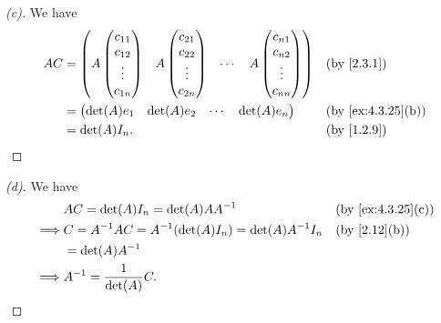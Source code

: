 \begin{proof}[(c)]
  We have
  \begin{align*}
    AC & = \begin{pmatrix}
             A \begin{pmatrix}
          c_{1 1} \\
          c_{1 2} \\
          \vdots  \\
          c_{1 n}
        \end{pmatrix} & A \begin{pmatrix}
                            c_{2 1} \\
                            c_{2 2} \\
                            \vdots  \\
                            c_{2 n}
                          \end{pmatrix} & \cdots & A \begin{pmatrix}
                                                       c_{n 1} \\
                                                       c_{n 2} \\
                                                       \vdots  \\
                                                       c_{n n}
                                                     \end{pmatrix}
           \end{pmatrix} &  & \by{2.3.1}                \\
       & = \begin{pmatrix}
             \det(A) e_1 & \det(A) e_2 & \cdots & \det(A) e_n
           \end{pmatrix}                                                   &  & \by{ex:4.3.25}[b]                            \\
       & = \det(A) I_n.                                                                                      &  & \by{1.2.9}
  \end{align*}
\end{proof}

\begin{proof}[(d)]
  We have
  \begin{align*}
             & AC = \det(A) I_n = \det(A) A A^{-1}                       &  & \by{ex:4.3.25}[c] \\
    \implies & C = A^{-1} AC = A^{-1} (\det(A) I_n) = \det(A) A^{-1} I_n &  & \by{2.12}[b]      \\
             & = \det(A) A^{-1}                                                                 \\
    \implies & A^{-1} = \frac{1}{\det(A)} C.
  \end{align*}
\end{proof}

